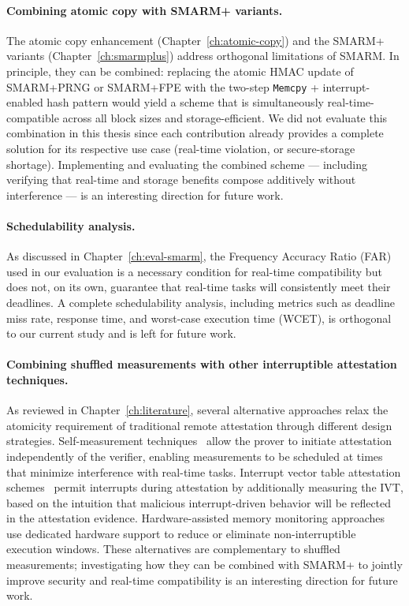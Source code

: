 \documentclass[a4paper,10pt]{article}
\begin{document}
{\paragraph{Combining atomic copy with SMARM+ variants.}
The atomic copy enhancement (Chapter~\ref{ch:atomic-copy}) and 
the SMARM+ variants (Chapter~\ref{ch:smarmplus}) address 
orthogonal limitations of SMARM. In principle, they can be 
combined: replacing the atomic HMAC update of 
SMARM+PRNG or SMARM+FPE with 
the two-step \texttt{Memcpy} + interrupt-enabled hash pattern 
would yield a scheme that is simultaneously real-time-compatible 
across all block sizes and storage-efficient. We did not 
evaluate this combination in this thesis since each contribution 
already provides a complete solution for its respective use 
case (real-time violation, or secure-storage shortage). 
Implementing and evaluating the combined scheme — including 
verifying that real-time and storage benefits compose 
additively without interference — is an interesting direction 
for future work.

\paragraph{Schedulability analysis.}
As discussed in Chapter~\ref{ch:eval-smarm}, the Frequency 
Accuracy Ratio (FAR) used in our evaluation is a necessary 
condition for real-time compatibility but does not, on its own, 
guarantee that real-time tasks will consistently meet their 
deadlines. A complete schedulability analysis, including metrics 
such as deadline miss rate, response time, and worst-case 
execution time (WCET), is orthogonal to our current study and 
is left for future work.

\paragraph{Combining shuffled measurements with other interruptible
attestation techniques.} As reviewed in Chapter~\ref{ch:literature},
several alternative approaches relax the atomicity requirement of
traditional remote attestation through different design strategies.
Self-measurement techniques~\cite{erasmus, reconciling-ra, iterator}
allow the prover to initiate attestation independently of the verifier,
enabling measurements to be scheduled at times that minimize interference
with real-time tasks. Interrupt vector table attestation
schemes~\cite{isc-flat, asap, pistis} permit interrupts during attestation
by additionally measuring the IVT, based on the intuition that malicious
interrupt-driven behavior will be reflected in the attestation evidence.
Hardware-assisted memory monitoring approaches~\cite{lo-fat, litehax,
atrium, perfcounter-ra} use dedicated hardware support to reduce or
eliminate non-interruptible execution windows. These alternatives are
complementary to shuffled measurements; investigating how they can be
combined with SMARM+ to jointly improve security and real-time
compatibility is an interesting direction for future work.

}
\end{document}
